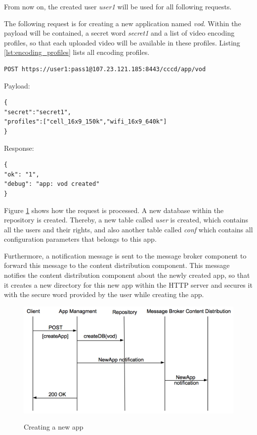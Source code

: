 From now on, the created user \textit{user1} will be used for all following requests.

The following request is for creating a new application named \textit{vod}. Within the payload will be contained, a secret word \textit{secret1} and a list of video encoding profiles, so that each uploaded video will be available in these profiles. Listing \ref{lst:encoding_profiles} lists all encoding profiles.

\begin{code}
\begin{verbatim}
POST https://user1:pass1@107.23.121.185:8443/cccd/app/vod
\end{verbatim}
Payload:
\begin{verbatim}
{
"secret":"secret1",
"profiles":["cell_16x9_150k","wifi_16x9_640k"]
}
\end{verbatim}
Response:
\begin{verbatim}
{
"ok": "1",
"debug": "app: vod created"
}
\end{verbatim}
\end{code}
 
Figure \ref{fig:newApp} shows how the request is processed. A new database within the repository is created. Thereby, a new table called \textit{user} is created, which contains all the users and their rights, and also another table called \textit{conf} which contains all configuration parameters that belongs to this app.

Furthermore, a notification message is sent to the message broker component to forward this message to the content distribution component. This message notifies the content distribution component about the newly created app, so that it creates a new directory for this new app within the HTTP server and secures it with the secure word provided by the user while creating the app.

\begin{figure}[htb]
  \centering
  \includegraphics[scale=0.6]{flows/newAppFlow.png}\\
  \caption{Creating a new app}
  \label{fig:newApp}
\end{figure}

